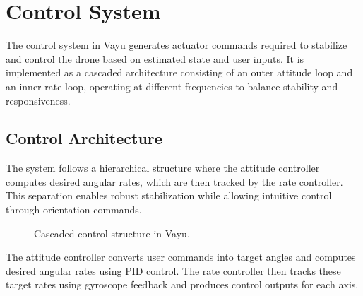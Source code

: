 \section{Control System}
\label{sec:vayu_control}

The control system in Vayu generates actuator commands required to stabilize and control the drone based on estimated state and user inputs. It is implemented as a cascaded architecture consisting of an outer attitude loop and an inner rate loop, operating at different frequencies to balance stability and responsiveness.

\subsection{Control Architecture}

The system follows a hierarchical structure where the attitude controller computes desired angular rates, which are then tracked by the rate controller. This separation enables robust stabilization while allowing intuitive control through orientation commands.

\begin{figure}[H]
    \centering
    \caption{Cascaded control structure in Vayu.}
\end{figure}

The attitude controller converts user commands into target angles and computes desired angular rates using PID control. The rate controller then tracks these target rates using gyroscope feedback and produces control outputs for each axis.

